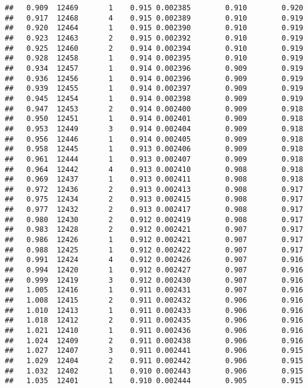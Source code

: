 \documentclass[
]{book}
\begin{document}
\begin{verbatim}
##   0.909  12469       1    0.915 0.002385        0.910        0.920
##   0.917  12468       4    0.915 0.002389        0.910        0.919
##   0.920  12464       1    0.915 0.002390        0.910        0.919
##   0.923  12463       2    0.915 0.002392        0.910        0.919
##   0.925  12460       2    0.914 0.002394        0.910        0.919
##   0.928  12458       1    0.914 0.002395        0.910        0.919
##   0.934  12457       1    0.914 0.002396        0.909        0.919
##   0.936  12456       1    0.914 0.002396        0.909        0.919
##   0.939  12455       1    0.914 0.002397        0.909        0.919
##   0.945  12454       1    0.914 0.002398        0.909        0.919
##   0.947  12453       2    0.914 0.002400        0.909        0.918
##   0.950  12451       1    0.914 0.002401        0.909        0.918
##   0.953  12449       3    0.914 0.002404        0.909        0.918
##   0.956  12446       1    0.914 0.002405        0.909        0.918
##   0.958  12445       1    0.913 0.002406        0.909        0.918
##   0.961  12444       1    0.913 0.002407        0.909        0.918
##   0.964  12442       4    0.913 0.002410        0.908        0.918
##   0.969  12437       1    0.913 0.002411        0.908        0.918
##   0.972  12436       2    0.913 0.002413        0.908        0.917
##   0.975  12434       2    0.913 0.002415        0.908        0.917
##   0.977  12432       2    0.913 0.002417        0.908        0.917
##   0.980  12430       2    0.912 0.002419        0.908        0.917
##   0.983  12428       2    0.912 0.002421        0.907        0.917
##   0.986  12426       1    0.912 0.002421        0.907        0.917
##   0.988  12425       1    0.912 0.002422        0.907        0.917
##   0.991  12424       4    0.912 0.002426        0.907        0.916
##   0.994  12420       1    0.912 0.002427        0.907        0.916
##   0.999  12419       3    0.912 0.002430        0.907        0.916
##   1.005  12416       1    0.911 0.002431        0.907        0.916
##   1.008  12415       2    0.911 0.002432        0.906        0.916
##   1.010  12413       1    0.911 0.002433        0.906        0.916
##   1.018  12412       2    0.911 0.002435        0.906        0.916
##   1.021  12410       1    0.911 0.002436        0.906        0.916
##   1.024  12409       2    0.911 0.002438        0.906        0.916
##   1.027  12407       3    0.911 0.002441        0.906        0.915
##   1.029  12404       2    0.911 0.002442        0.906        0.915
##   1.032  12402       1    0.910 0.002443        0.906        0.915
##   1.035  12401       1    0.910 0.002444        0.905        0.915

\end{verbatim}
\end{document}
